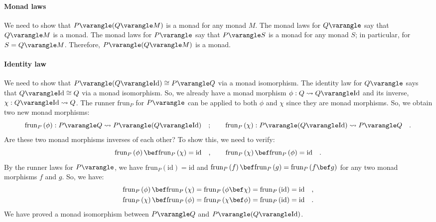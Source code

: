 \paragraph{Monad laws}

We need to show that $P\varangle(Q\varangle M)$ is a monad for any
monad $M$. The monad laws for $Q\varangle$ say that $Q\varangle M$
is a monad. The monad laws for $P\varangle$ say that $P\varangle S$
is a monad for any monad $S$; in particular, for $S=Q\varangle M$.
Therefore, $P\varangle(Q\varangle M)$ is a monad.

\paragraph{Identity law}

We need to show that $P\varangle(Q\varangle\text{Id})\cong P\varangle Q$
via a monad isomorphism. The identity law for $Q\varangle$ says that
$Q\varangle\text{Id}\cong Q$ via a monad isomorphism. So, we already
have a monad morphism $\phi:Q\leadsto Q\varangle\text{Id}$ and its
inverse, $\chi:Q\varangle\text{Id}\leadsto Q$. The runner $\text{frun}_{P}$
for $P\varangle$ can be applied to both $\phi$ and $\chi$ since
they are monad morphisms. So, we obtain two new monad morphisms:
\[
\text{frun}_{P}\left(\phi\right):P\varangle Q\leadsto P\varangle(Q\varangle\text{Id})\quad;\quad\quad\text{frun}_{P}\left(\chi\right):P\varangle(Q\varangle\text{Id})\leadsto P\varangle Q\quad.
\]
Are these two monad morphisms inverses of each other? To show this,
we need to verify:
\[
\text{frun}_{P}\left(\phi\right)\bef\text{frun}_{P}\left(\chi\right)=\text{id}\quad,\quad\quad\text{frun}_{P}\left(\chi\right)\bef\text{frun}_{P}\left(\phi\right)=\text{id}\quad.
\]
By the runner laws for $P\varangle$, we have $\text{frun}_{P}\left(\text{id}\right)=\text{id}$
and $\text{frun}_{P}\left(f\right)\bef\text{frun}_{P}\left(g\right)=\text{frun}_{P}\left(f\bef g\right)$
for any two monad morphisms $f$ and $g$. So, we have:
\begin{align*}
\text{frun}_{P}\left(\phi\right)\bef\text{frun}_{P}\left(\chi\right) & =\text{frun}_{P}\left(\phi\bef\chi\right)=\text{frun}_{P}\left(\text{id}\right)=\text{id}\quad,\\
\text{frun}_{P}\left(\chi\right)\bef\text{frun}_{P}\left(\phi\right) & =\text{frun}_{P}\left(\chi\bef\phi\right)=\text{frun}_{P}\left(\text{id}\right)=\text{id}\quad.
\end{align*}
We have proved a monad isomorphism between $P\varangle Q$ and $P\varangle(Q\varangle\text{Id})$.

